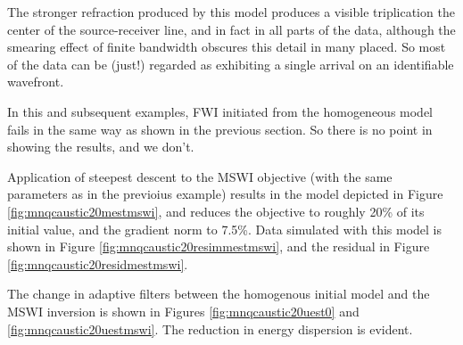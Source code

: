 
The stronger refraction produced by this model produces a visible triplication
the center of the source-receiver line, and in fact in all parts of
the data, although the smearing effect of finite bandwidth obscures this
detail in many placed. So most of the data can be (just!) regarded as exhibiting a single
arrival on an identifiable wavefront.

In this and subsequent examples, FWI initiated from the homogeneous
model fails in the same way as shown in the  previous section. So
there is no point in showing the results, and we don't.

Application of steepest descent to the MSWI objective (with the same
parameters as in the previoius example) results in the model depicted
in Figure \ref{fig:mnqcaustic20mestmswi}, and reduces the objective to
roughly 20\% of its initial value, and the gradient norm to 7.5\%. Data
simulated with this model is shown in Figure
\ref{fig:mnqcaustic20resimmestmswi}, and the residual in Figure
\ref{fig:mnqcaustic20residmestmswi}.



The change in adaptive filters between the homogenous initial model
and the MSWI inversion is shown in Figures
\ref{fig:mnqcaustic20uest0} and \ref{fig:mnqcaustic20uestmswi}. The
reduction in energy dispersion is evident.


